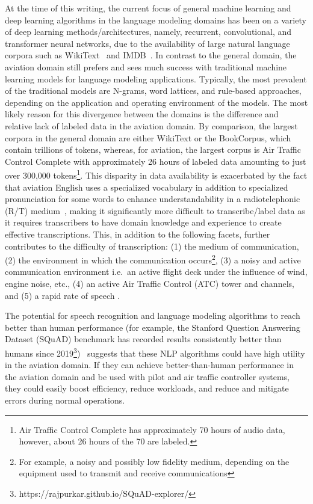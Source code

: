\documentclass[12pt]{article}
\begin{document}
At the time of this writing, the current focus of general machine learning and deep learning algorithms in the language modeling domains has been on a variety of deep learning methods/architectures, namely, recurrent, convolutional, and transformer neural networks, due to the availability of large natural language corpora such as WikiText~\cite{merity_pointer_2016} and IMDB~\cite{maas_learning_2011}. In contrast to the general domain, the aviation domain still prefers and sees much success with traditional machine learning models for language modeling applications. Typically, the most prevalent of the traditional models are N-grams, word lattices, and rule-based approaches, depending on the application and operating environment of the models. The most likely reason for this divergence between the domains is the difference and relative lack of labeled data in the aviation domain. By comparison, the largest corpora in the general domain are either WikiText or the BookCorpus, which contain trillions of tokens, whereas, for aviation, the largest corpus is Air Traffic Control Complete with approximately 26 hours of labeled data amounting to just over 300,000 tokens\footnote{Air Traffic Control Complete has approximately 70 hours of audio data, however, about 26 hours of the 70 are labeled.}. This disparity in data availability is exacerbated by the fact that aviation English uses a specialized vocabulary in addition to specialized pronunciation for some words to enhance understandability in a radiotelephonic (R/T) medium~\cite{paltridge_handbook_2013}, making it significantly more difficult to transcribe/label data as it requires transcribers to have domain knowledge and experience to create effective transcriptions. This, in addition to the following facets, further contributes to the difficulty of transcription: (1) the medium of communication, (2) the environment in which the communication occurs\footnote{For example, a noisy and possibly low fidelity medium, depending on the equipment used to transmit and receive communications}, (3) a noisy and active communication environment i.e.~an active flight deck under the influence of wind, engine noise, etc., (4) an active Air Traffic Control (ATC) tower and channels, and (5) a rapid rate of speech \cite{paltridge_handbook_2013}.

The potential for speech recognition and language modeling algorithms to reach better than human performance (for example, the Stanford Question Answering Dataset (SQuAD) benchmark has recorded results consistently better than humans since 2019\footnote{https://rajpurkar.github.io/SQuAD-explorer/})~\cite{zhang_ai_2022} suggests that these NLP algorithms could have high utility in the aviation domain. If they can achieve better-than-human performance in the aviation domain and be used with pilot and air traffic controller systems, they could easily boost efficiency, reduce workloads, and reduce and mitigate errors during normal operations.
\end{document}
